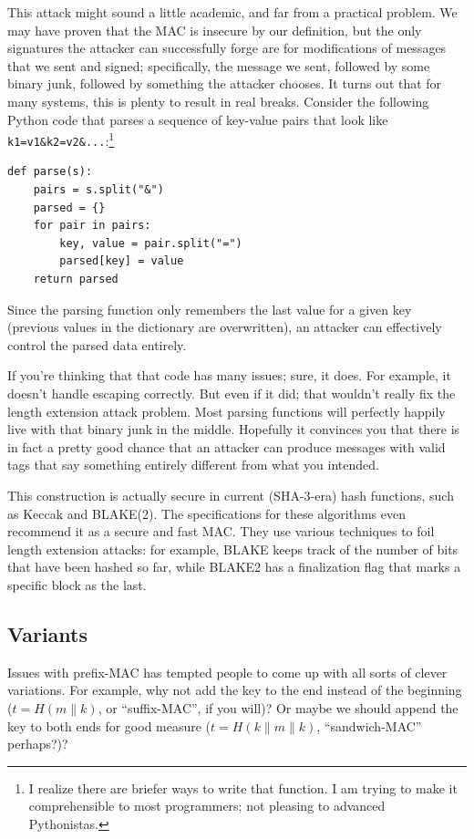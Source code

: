 \documentclass[11pt,ebook,table,dvipsnames]{memoir}
\begin{document}
This attack might sound a little academic, and far from a practical
problem. We may have proven that the MAC is insecure by our
definition, but the only signatures the attacker can successfully
forge are for modifications of messages that we sent and signed;
specifically, the message we sent, followed by some binary junk,
followed by something the attacker chooses. It turns out that for many
systems, this is plenty to result in real breaks. Consider the
following Python code that parses a sequence of key-value pairs that
look like \verb~k1=v1&k2=v2&...~:\footnote{I realize there are briefer ways to
write that function. I am trying to make it comprehensible to most
programmers; not pleasing to advanced Pythonistas.}

\begin{verbatim}
def parse(s):
    pairs = s.split("&")
    parsed = {}
    for pair in pairs:
        key, value = pair.split("=")
        parsed[key] = value
    return parsed
\end{verbatim}

Since the parsing function only remembers the last value for a given
key (previous values in the dictionary are overwritten), an attacker
can effectively control the parsed data entirely.

If you're thinking that that code has many issues; sure, it does. For
example, it doesn't handle escaping correctly. But even if it did;
that wouldn't really fix the length extension attack problem. Most
parsing functions will perfectly happily live with that binary junk in
the middle. Hopefully it convinces you that there is in fact a pretty
good chance that an attacker can produce messages with valid tags that
say something entirely different from what you intended.

This construction is actually secure in current (SHA-3-era) hash
functions, such as Keccak and BLAKE(2). The specifications for these
algorithms even recommend it as a secure and fast MAC. They use
various techniques to foil length extension attacks: for example,
BLAKE keeps track of the number of bits that have been hashed so far,
while BLAKE2 has a finalization flag that marks a specific block as
the last.
\subsection{Variants}
\label{sec-2-7-3-2}

Issues with prefix-MAC has tempted people to come up with all sorts of
clever variations. For example, why not add the key to the end instead
of the beginning ($t = H(m \| k)$, or \enquote{suffix-MAC}, if you will)? Or
maybe we should append the key to both ends for good measure ($t = H(k
\| m \| k)$, \enquote{sandwich-MAC} perhaps?)?
\end{document}
